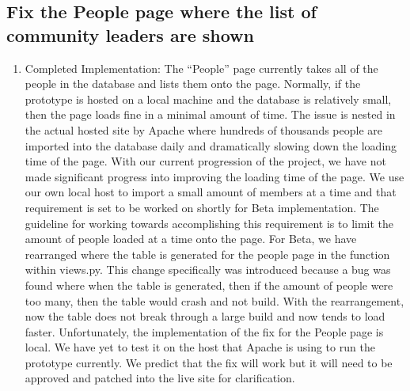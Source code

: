 \documentclass[draftclsnofoot,10pt,onecolumn]{IEEEtran} %
\begin{document}
\subsection{Fix the People page where the list of community leaders are shown}
\begin{enumerate}
  \item Completed Implementation: The “People” page currently takes all of the
    people in the database and lists them onto the page. Normally, if the
    prototype is hosted on a local machine and the database is relatively small,
    then the page loads fine in a minimal amount of time. The issue is nested in
    the actual hosted site by Apache where hundreds of thousands people are
    imported into the database daily and dramatically slowing down the loading
    time of the page.  With our current progression of the project, we have not
    made significant progress into improving the loading time of the page. We
    use our own local host to import a small amount of members at a time and
    that requirement is set to be worked on shortly for Beta implementation. The
    guideline for working towards accomplishing this requirement is to limit the
    amount of people loaded at a time onto the page. For Beta, we have
    rearranged where the table is generated for the people page in the function
    within views.py. This change specifically was introduced because a bug was
    found where when the table is generated, then if the amount of people were
    too many, then the table would crash and not build. With the rearrangement,
    now the table does not break through a large build and now tends to load
    faster. Unfortunately, the implementation of the fix for the People page is
    local. We have yet to test it on the host that Apache is using to run the
    prototype currently. We predict that the fix will work but it will need to
    be approved and patched into the live site for clarification.
\end{enumerate}
\fi

\iffalse
\end{document}
